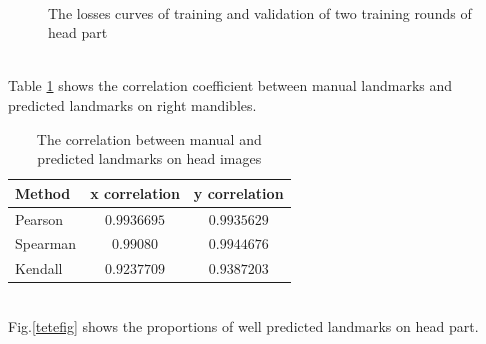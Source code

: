 \documentclass[12pt,a4paper]{article}
\begin{document}
\begin{figure}[h!]
\centering
{}~~
\caption{The losses curves of training and validation of two training rounds of head part  }
\label{losstetecurves}
\end{figure}~\\
Table \ref{corrhead} shows the correlation coefficient between manual landmarks and predicted landmarks on right mandibles.
\begin{table}[h!]
	\centering
	\begin{tabular}{l c c}
		Method & x correlation & y correlation \\ \hline
		Pearson & $0.9936695$ & $0.9935629$ \\ \hline
		Spearman & $0.99080$ & $0.9944676$ \\ \hline
		Kendall & $0.9237709$ & $0.9387203$ \\ \hline
	\end{tabular}
	\caption{The correlation between manual and predicted landmarks on head images}
	\label{corrhead}
\end{table}~\\
Fig.\ref{tetefig} shows the proportions of well predicted landmarks on head part.
\end{document}
